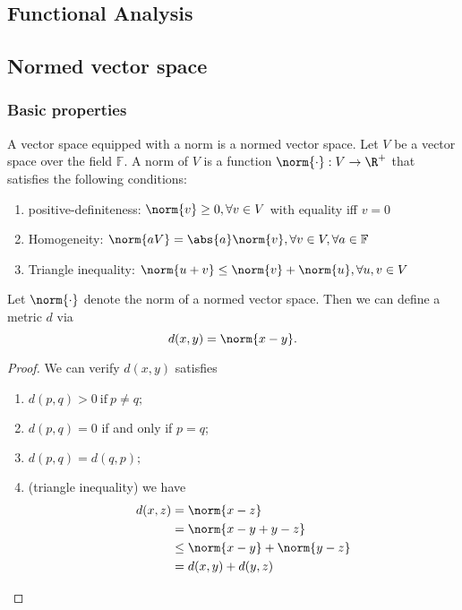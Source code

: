 \begin{refsection}
\startcontents[chapters]	
\chapter{Functional Analysis}\label{ch:functional-analysis}


\section{Normed vector space}\label{ch:functional-analysis:sec:normed-vector-space}
\subsection{Basic properties}
\begin{definition}
A vector space equipped with a norm is a normed vector space. Let $V$ be a vector space over the field $\mathbb{F}$. A norm of $V$ is a function $\norm{\cdot}: V\rightarrow  \R^+$ that satisfies the following conditions:
\begin{enumerate}
    \item positive-definiteness: $\norm{v}\geq 0, \forall v \in V$ with equality iff $v=0$
    \item Homogeneity: $\norm{aV}=\abs{a}\norm{v},\forall v\in V,\forall a\in \mathbb{F}$
    \item Triangle inequality: $\norm{u+v} \leq \norm{v} + \norm{u},\forall u,v\in V$
\end{enumerate}
\end{definition}


\begin{lemma}\label{ch:functional-analysis:th:normAsmetric}
Let $\norm{\cdot}$ denote the norm of a normed vector space. Then we can define a metric $d$ via
$$d(x,y) = \norm{x-y}.$$	
\end{lemma}
\begin{proof}
We can verify $d(x,y)$ satisfies
\begin{enumerate}
	\item $d(p,q) > 0 ~\text{if}~ p \neq q;$
	\item  $d(p,q)=0$ if and only if $p=q$;
	\item $d(p,q) = d(q,p);$
	\item (triangle inequality) we have
	\begin{align*}
	d(x,z) &= \norm{x-z} \\
	 		&= \norm{x - y + y-z} \\
	 		&\leq \norm{x - y} + \norm{y-z} \\
	 		& = d(x,y) + d(y,z)
	\end{align*}
\end{enumerate}		
\end{proof}


\end{refsection}
